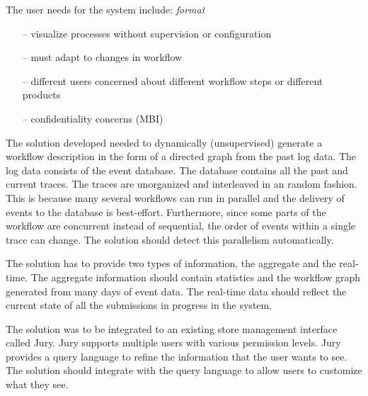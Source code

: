 \documentclass[english,12pt,a4paper,pdftex,sci,utf8]{aaltothesis}
\newcommand{\nyi}[1]{\colorbox{nyibg}{\textcolor{nyitext}{\emph{#1}}}\PackageWarning{NYI}{#1}}
\begin{document}
The user needs for the system include: \nyi{format}
\begin{itemize}
\item[--]visualize processes without supervision or configuration
\item[--]must adapt to changes in workflow
\item[--]different users concerned about different workflow steps or different products
\item[--]confidentiality concerns (MBI)
\end{itemize}

The solution developed needed to dynamically (unsupervised) generate a workflow description in the form of a directed graph
from the past log data. The log data consists of the event database. The database contains all the 
past and current traces. The traces are unorganized and interleaved in an random fashion. This is because many several
workflows can run in parallel and the delivery of events to the database is best-effort. Furthermore, since some parts of the workflow are concurrent instead of sequential, the order of events within a single trace can change. 
The solution should detect this parallelism automatically.

The solution has to provide two types of information, the aggregate and the real-time. 
The aggregate information should contain statistics and the workflow graph generated from many days of event data.
The real-time data should reflect the current state of all the submissions in progress in the system.

The solution was to be integrated to an existing store management interface called Jury. 
Jury supports multiple users with various permission levels. Jury provides a query language to refine the information
that the user wants to see. The solution should integrate with the query language to allow users to customize 
what they see.

\end{document}
